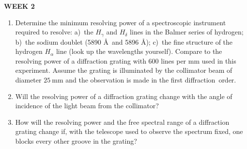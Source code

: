 \documentclass[12pt]{article}
\begin{document}
\vspace{1in}

\hfil \textbf{\large WEEK 2} \hfil

\begin{enumerate}[resume]
    \item Determine the minimum resolving power of a spectroscopic instrument required to resolve: a)~the $H_{\gamma}$ and $H_{\delta}$ lines in the Balmer series of hydrogen; b)~the sodium doublet (5890 \AA\, and 5896 \AA); c)~the fine structure of the hydrogen $H_{\alpha}$ line (look up the wavelengths yourself). Compare to the resolving power of a diffraction grating with 600 lines per mm used in this experiment. Assume the grating is illuminated by the collimator beam of diameter $25~$mm and the observation is made in the first diffraction~order.
    \item Will the resolving power of a diffraction grating change with the angle of incidence of the light beam from the collimator? 
    \item How will the resolving power and the free spectral range of a diffraction grating change if, with the telescope used to observe the spectrum fixed, one blocks every other groove in the grating?
\end{enumerate}
\end{document}
